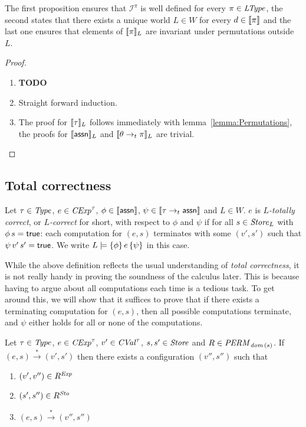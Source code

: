 \documentclass[12pt,a4paper]{report}
\newcommand{\CExp}{\nstyle{CExp}}
\newcommand{\CVal}{\nstyle{CVal}}
\newcommand{\Sto}{\nstyle{Sto}}
\newcommand{\PERM}{\nstyle{PERM}}
\newcommand{\I}{\mathcal{I}}
\begin{document}
The first proposition ensures that $\I^\pi$ is well defined for every $\pi\in\mathit{LType}$, the
second states that there exists a unique world $L \in W$ for every $d \in \llbracket\pi\rrbracket$ and
the last one ensures that elements of $\llbracket\pi\rrbracket_L$ are invariant under permutations
outside $L$.

\begin{proof} \
  \begin{enumerate}
    \item {\bf TODO}

    \item Straight forward induction.

    \item The proof for $\llbracket\tau\rrbracket_L$ follows immediately with
          lemma~\ref{lemma:Permutations}, the proofs for
          $\llbracket\mathsf{assn}\rrbracket_L$ and $\llbracket\theta\rightarrow_t\pi\rrbracket_L$
          are trivial.
  \end{enumerate}
\end{proof}



\subsection{Total correctness}

\begin{definition}
  Let $\tau\in\mathit{Type}$, $e\in\CExp^\tau$, $\phi\in\llbracket\mathsf{assn}\rrbracket$, $\psi\in\llbracket\tau\rightarrow_t\mathsf{assn}\rrbracket$
  and $L\in W$. $e$ is {\em $L$-totally correct}, or {\em $L$-correct} for short, with respect to $\phi$ and
  $\psi$ if for all $s\in\mathit{Store}_L$ with $\phi\,s=\mathsf{true}$: each computation for $(e,s)$ terminates with some
  $(v',s')$ such that $\psi\,v'\,s'=\mathsf{true}$. We write $L \models \{\phi\}\,e\,\{\psi\}$ in this case.
\end{definition}

While the above definition reflects the usual understanding of {\em total correctness}, it is not really handy
in proving the soundness of the calculus later. This is because having to argue about all computations each
time is a tedious task. To get around this, we will show that it suffices to prove that if there exists a
terminating computation for $(e,s)$, then all possible computations terminate, and $\psi$ either holds for all
or none of the computations.

\begin{lemma}
  Let $\tau\in\mathit{Type}$, $e\in\CExp^\tau$, $v'\in\CVal^\tau$, $s,s'\in\mathit{Store}$
  and $R \in \PERM_{\dom{s}}$. If $(e,s)\xrightarrow*(v',s')$ then there
  exists a configuration $(v'',s'')$ such that
  \begin{enumerate}
    \item $(v',v'')\in R^{\mathit{Exp}}$
    \item $(s',s'')\in R^\Sto$
    \item $(e,s) \xrightarrow* (v'',s'')$
  \end{enumerate}
\end{lemma}
\end{document}
